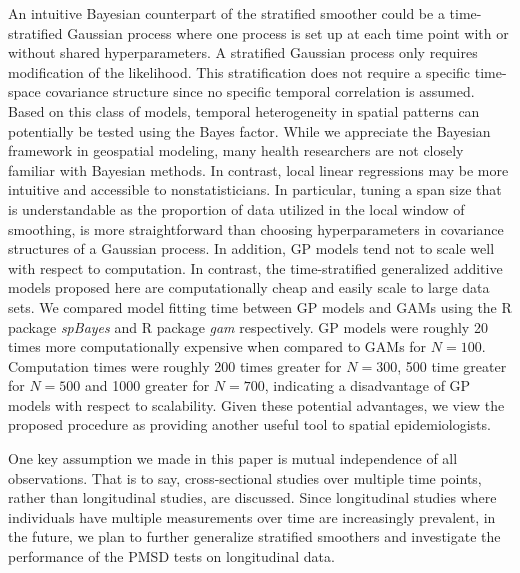 	An intuitive Bayesian counterpart of the stratified smoother could be a time-stratified Gaussian process where one process is set up at each time point with or without shared hyperparameters. A stratified Gaussian process only requires modification of the likelihood. This stratification does not require a specific time-space covariance structure since no specific temporal correlation is assumed. Based on this class of models, temporal heterogeneity in spatial patterns can potentially be tested using the Bayes factor.\citep{kass1995bayes} While we appreciate the Bayesian framework in geospatial modeling, many health researchers are not closely familiar with Bayesian methods.  In contrast, local linear regressions may be more intuitive and accessible to nonstatisticians. In particular, tuning a span size that is understandable as the proportion of data utilized in the local window of smoothing, is more straightforward than choosing hyperparameters in covariance structures of a Gaussian process. In addition, GP models tend not to scale well with respect to computation. In contrast, the time-stratified generalized additive models proposed here are computationally cheap and easily scale to large data sets. We compared model fitting time between GP models and GAMs using the R package \emph{spBayes} \citep{Finley2007, Finley2015} and R package \emph{gam} \citep{hastie1990generalized} respectively. GP models were roughly 20 times more computationally expensive when compared to GAMs for $N=100$. Computation times were roughly 200 times greater for $N=300$, 500 time greater for $N=500$ and 1000 greater for $N=700$, indicating a disadvantage of GP models with respect to scalability. Given these potential advantages, we view the proposed procedure as providing another useful tool to spatial epidemiologists.
	
	
	One key assumption we made in this paper is mutual independence of all observations. That is to say, cross-sectional studies over multiple time points, rather than longitudinal studies, are discussed. Since longitudinal studies where individuals have multiple measurements over time are increasingly prevalent, in the future, we plan to further generalize stratified smoothers and investigate the performance of the PMSD tests on longitudinal data.
	


